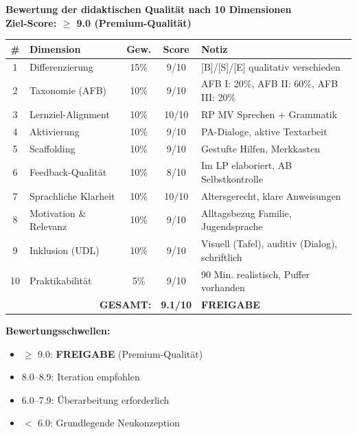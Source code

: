 \documentclass[11pt,a4paper]{article}
\begin{document}
\begin{scorebox}
\textbf{Bewertung der didaktischen Qualität nach 10 Dimensionen}\\
\textbf{Ziel-Score: $\geq$ 9.0 (Premium-Qualität)}

\vspace{1em}
\begin{tabular}{|c|l|c|c|p{4.5cm}|}
\hline
\textbf{\#} & \textbf{Dimension} & \textbf{Gew.} & \textbf{Score} & \textbf{Notiz} \\
\hline
1 & Differenzierung & 15\% & 9/10 & [B]/[S]/[E] qualitativ verschieden \\
\hline
2 & Taxonomie (AFB) & 10\% & 9/10 & AFB I: 20\%, AFB II: 60\%, AFB III: 20\% \\
\hline
3 & Lernziel-Alignment & 10\% & 10/10 & RP MV Sprechen + Grammatik \\
\hline
4 & Aktivierung & 10\% & 9/10 & PA-Dialoge, aktive Textarbeit \\
\hline
5 & Scaffolding & 10\% & 9/10 & Gestufte Hilfen, Merkkasten \\
\hline
6 & Feedback-Qualität & 10\% & 8/10 & Im LP elaboriert, AB Selbstkontrolle \\
\hline
7 & Sprachliche Klarheit & 10\% & 10/10 & Altersgerecht, klare Anweisungen \\
\hline
8 & Motivation \& Relevanz & 10\% & 9/10 & Alltagsbezug Familie, Jugendsprache \\
\hline
9 & Inklusion (UDL) & 10\% & 9/10 & Visuell (Tafel), auditiv (Dialog), schriftlich \\
\hline
10 & Praktikabilität & 5\% & 9/10 & 90 Min. realistisch, Puffer vorhanden \\
\hline
\multicolumn{3}{|r|}{\textbf{GESAMT:}} & \textbf{9.1/10} & \textcolor{successgreen}{\textbf{FREIGABE}} \\
\hline
\end{tabular}

\vspace{1em}
\textbf{Bewertungsschwellen:}
\begin{itemize}
    \item[$\boxtimes$] \textcolor{successgreen}{$\geq$ 9.0: \textbf{FREIGABE} (Premium-Qualität)}
    \item[$\Box$] \textcolor{warningorange}{8.0--8.9: Iteration empfohlen}
    \item[$\Box$] 6.0--7.9: Überarbeitung erforderlich
    \item[$\Box$] $<$ 6.0: Grundlegende Neukonzeption
\end{itemize}
\end{scorebox}
\end{document}
